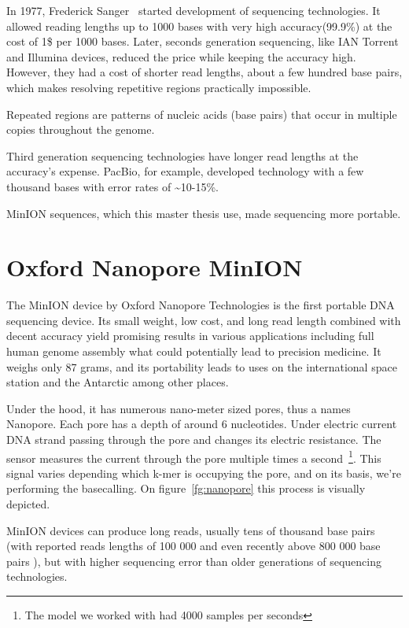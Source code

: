 \documentclass[times, utf8, diplomski, english]{fer}
\begin{document}
In 1977, Frederick Sanger~\citep{mile}\citep{Pettersson2009} started development of sequencing technologies. It allowed reading lengths up to 1000 bases with very high accuracy(99.9\%) at the cost of 1\$ per 1000 bases.
Later, seconds generation sequencing, like IAN Torrent and Illumina devices, reduced the price while keeping the accuracy high. However, they had a cost of shorter read lengths, about a few hundred base pairs, which makes resolving repetitive regions practically impossible.

Repeated regions are patterns of nucleic acids (base pairs) that occur in multiple copies throughout the genome. 

Third generation sequencing technologies have longer read lengths at the accuracy's expense. PacBio, for example, developed technology with a few thousand bases with error rates of \textasciitilde10-15\%. 

MinION sequences, which this master thesis use, made sequencing more portable.

\section{Oxford Nanopore MinION}

The MinION device by Oxford Nanopore Technologies is the first portable DNA sequencing device. Its small weight, low cost, and long read length combined with decent accuracy yield promising results in various applications including full human genome assembly \cite{human_seq} what could potentially lead to precision medicine. It weighs only 87 grams, and its portability leads to uses on the international space station and the Antarctic among other places.

Under the hood, it has numerous nano-meter sized pores, thus a names Nanopore. Each pore has a depth of around 6 nucleotides. Under electric current DNA strand passing through the pore and changes its electric resistance. The sensor measures the current through the pore multiple times a second~\footnote{The model we worked with had 4000 samples per seconds}. This signal varies depending which k-mer is occupying the pore, and on its basis, we're performing the basecalling. On figure~\ref{fg:nanopore} this process is visually depicted. 

MinION devices can produce long reads, usually tens of thousand base pairs (with reported reads lengths of 100 000\cite{loman1-100k} and even recently above 800 000 base pairs \cite{loman2-800k}), but with higher sequencing error than older generations of sequencing technologies.
\end{document}
